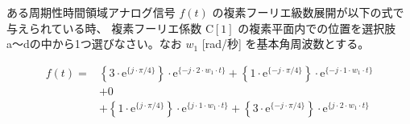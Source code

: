 ある周期性時間領域アナログ信号 $f(t)$ の複素フーリエ級数展開が以下の式で与えられている時、
複素フーリエ係数 $\textrm{C}[1]$ の複素平面内での位置を選択肢a〜dの中から1つ選びなさい。なお $w_1$ [rad/秒] を基本角周波数とする。

\begin{align*}
f(t) =
&  \left \{ 3 \cdot \textrm{e}^{\{ j \cdot \pi/4 \}} \right \} \cdot \textrm{e}^{\{-j \cdot    2 \cdot w_1 \cdot t \}}
 + \left \{ 1 \cdot \textrm{e}^{\{-j \cdot \pi/4 \}} \right \} \cdot \textrm{e}^{\{-j \cdot    1 \cdot w_1 \cdot t \}} \\
&+ 0 \\
&+ \left \{ 1 \cdot \textrm{e}^{\{ j \cdot \pi/4 \}} \right \} \cdot \textrm{e}^{\{ j \cdot    1 \cdot w_1 \cdot t \}} 
 + \left \{ 3 \cdot \textrm{e}^{\{-j \cdot \pi/4 \}} \right \} \cdot \textrm{e}^{\{ j \cdot    2 \cdot w_1 \cdot t \}} 
\end{align*}
